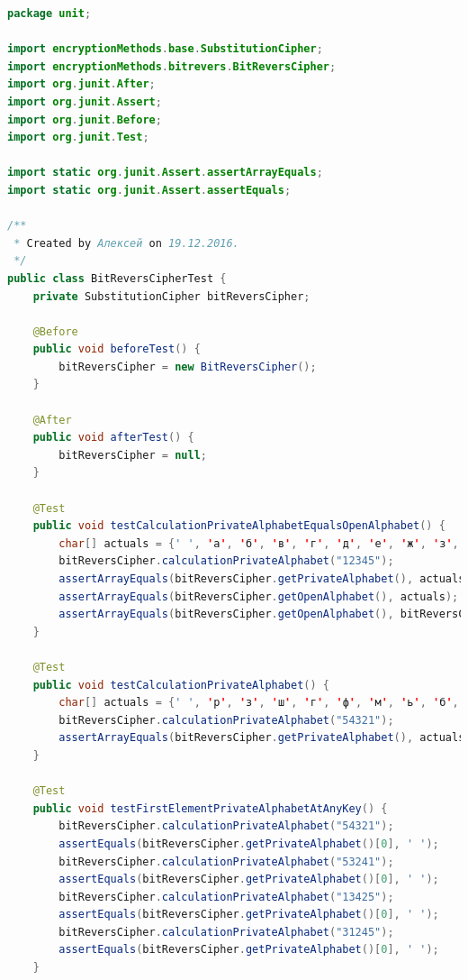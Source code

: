 \documentclass[a4paper,12pt]{article}
\begin{document}
\begin{lstlisting}[language=java, caption=код модуля BitReversCipherTest.java]
package unit;

import encryptionMethods.base.SubstitutionCipher;
import encryptionMethods.bitrevers.BitReversCipher;
import org.junit.After;
import org.junit.Assert;
import org.junit.Before;
import org.junit.Test;

import static org.junit.Assert.assertArrayEquals;
import static org.junit.Assert.assertEquals;

/**
 * Created by Алексей on 19.12.2016.
 */
public class BitReversCipherTest {
    private SubstitutionCipher bitReversCipher;

    @Before
    public void beforeTest() {
        bitReversCipher = new BitReversCipher();
    }

    @After
    public void afterTest() {
        bitReversCipher = null;
    }

    @Test
    public void testCalculationPrivateAlphabetEqualsOpenAlphabet() {
        char[] actuals = {' ', 'а', 'б', 'в', 'г', 'д', 'е', 'ж', 'з', 'и', 'к', 'л', 'м', 'н', 'о', 'п', 'р', 'с', 'т', 'у', 'ф', 'х', 'ц', 'ч', 'ш', 'щ', 'ъ', 'ы', 'ь', 'э', 'ю', 'я'};
        bitReversCipher.calculationPrivateAlphabet("12345");
        assertArrayEquals(bitReversCipher.getPrivateAlphabet(), actuals);
        assertArrayEquals(bitReversCipher.getOpenAlphabet(), actuals);
        assertArrayEquals(bitReversCipher.getOpenAlphabet(), bitReversCipher.getOpenAlphabet());
    }

    @Test
    public void testCalculationPrivateAlphabet() {
        char[] actuals = {' ', 'р', 'з', 'ш', 'г', 'ф', 'м', 'ь', 'б', 'т', 'к', 'ъ', 'е', 'ц', 'о', 'ю', 'а', 'с', 'и', 'щ', 'д', 'х', 'н', 'э', 'в', 'у', 'л', 'ы', 'ж', 'ч', 'п', 'я'};
        bitReversCipher.calculationPrivateAlphabet("54321");
        assertArrayEquals(bitReversCipher.getPrivateAlphabet(), actuals);
    }

    @Test
    public void testFirstElementPrivateAlphabetAtAnyKey() {
        bitReversCipher.calculationPrivateAlphabet("54321");
        assertEquals(bitReversCipher.getPrivateAlphabet()[0], ' ');
        bitReversCipher.calculationPrivateAlphabet("53241");
        assertEquals(bitReversCipher.getPrivateAlphabet()[0], ' ');
        bitReversCipher.calculationPrivateAlphabet("13425");
        assertEquals(bitReversCipher.getPrivateAlphabet()[0], ' ');
        bitReversCipher.calculationPrivateAlphabet("31245");
        assertEquals(bitReversCipher.getPrivateAlphabet()[0], ' ');
    }


\end{lstlisting}
\end{document}
